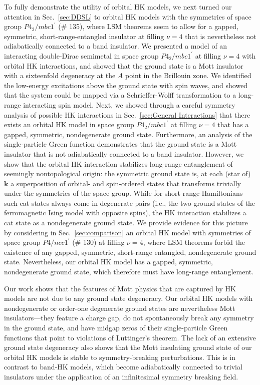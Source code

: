 \documentclass[prb,aps,amssymb,twocolumn,notitlepage]{revtex4-2}
\begin{document}
To fully demonstrate the utility of orbital HK models, we next turned our attention in Sec.~\ref{sec:DDSL} to orbital HK models with the symmetries of space group $P4_2/mbc1^\prime$ (\# 135), where LSM theorems seem to allow for a gapped, symmetric, short-range-entangled insulator at filling $\nu=4$ that is nevertheless not adiabatically connected to a band insulator. 
We presented a model of an interacting double-Dirac semimetal in space group $P4_2/mbc1^\prime$ at filling $\nu=4$ with orbital HK interactions, and showed that the ground state is a Mott insulator with a sixteenfold degeneracy at the $A$ point in the Brillouin zone. 
We identified the low-energy excitations above the ground state with spin waves, and showed that the system could be mapped via a Schrieffer-Wolff transformation to a long-range interacting spin model. 
Next, we showed through a careful symmetry analysis of possible HK interactions in Sec.~\ref{sec:General Interactions} that there exists an orbital HK model in space group $P4_2/mbc1^\prime$ at filling $\nu=4$ that has a gapped, symmetric, nondegenerate ground state. 
Furthermore, an analysis of the single-particle Green function demonstrates that the ground state is a Mott insulator that is not adiabatically connected to a band insulator. 
However, we show that the orbital HK interaction stabilizes long-range entanglement of seemingly nontopological origin: the symmetric ground state is, at each (star of) $\mathbf{k}$ a superposition of orbital- and spin-ordered states that transforms trivially under the symmetries of the space group. 
While for short-range Hamiltonians such cat states always come in degenerate pairs (i.e., the two ground states of the ferromagnetic Ising model with opposite spins), the HK interaction stabilizes a cat state as a nondegenerate ground state. 
We provide evidence for this picture by considering in Sec.~\ref{sec:comparison} an orbital HK model with symmetries of space group $P4/ncc1^\prime$ (\# 130) at filling $\nu=4$, where LSM theorems forbid the existence of any gapped, symmetric, short-range entangled, nondegenerate ground state. 
Nevertheless, our orbital HK model has a gapped, symmetric, nondegenerate ground state, which therefore must have long-range entanglement. 

Our work shows that the features of Mott physics that are captured by HK models are not due to any ground state degeneracy. 
Our orbital HK models with nondegenerate or order-one degenerate ground states are nevertheless Mott insulators---they feature a charge gap, do not spontaneously break any symmetry in the ground state, and have midgap zeros of their single-particle Green functions that point to violations of Luttinger's theorem. 
The lack of an extensive ground state degeneracy also shows that the Mott insulating ground state of our orbital HK models is stable to symmetry-breaking perturbations. 
This is in contrast to band-HK models, which become adiabatically connected to trivial insulators under the application of an infinitesimal symmetry breaking field.
\end{document}
